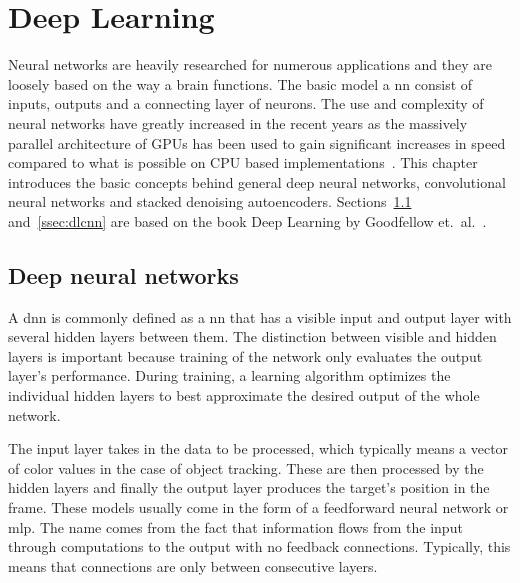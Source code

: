 \section{Deep Learning}
Neural networks are heavily researched for numerous applications and they are loosely
based on the way a brain functions. The basic model a \ac{nn} consist of inputs, outputs
and a connecting layer of neurons. The use and complexity of neural networks have greatly
increased in the recent years as the massively parallel architecture of GPUs has been
used to gain significant increases in speed compared to what is possible on CPU based
implementations~\cite{NIPS_IMAGENET}. This chapter introduces the basic concepts behind
general deep neural networks, convolutional neural networks and stacked denoising
autoencoders. Sections~\ref{ssec:dldnn} and~\ref{ssec:dlcnn} are based on the book Deep Learning
by Goodfellow et.~al.~\cite{DEEP_LEARNING}.

\subsection{Deep neural networks}\label{ssec:dldnn}

A \ac{dnn} is commonly defined as a \ac{nn} that has a visible input and output layer
with several hidden layers between them. The distinction between visible and hidden
layers is important because training of the network only evaluates the output layer's
performance. During training, a learning algorithm optimizes the individual hidden
layers to best approximate the desired output of the whole network.

The input layer takes in the data to be processed, which typically means a vector of
color values in the case of object tracking. These are then processed by the hidden
layers and finally the output layer produces the target's position in the frame. These
models usually come in the form of a feedforward neural network or \ac{mlp}. The name
comes from the fact that information flows from the input through computations to the
output with no feedback connections. Typically, this means that connections are only
between consecutive layers.


